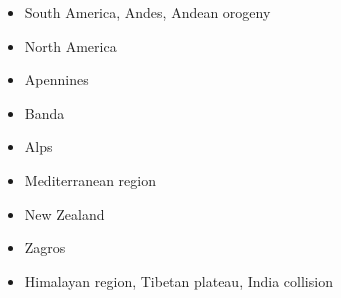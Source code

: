 \begin{itemize}
\item South America, Andes, Andean orogeny 
{\scriptsize
\cite{wdbo94b}
\cite{gusb00}
\cite{vavv02b}
\cite{baso05}\cite{soba05}
\cite{basv06}\cite{meph06}\cite{iabd06}\cite{oncf06}\cite{sobk06}
\cite{iabb07}
\cite{esfm08}\cite{heib08}\cite{iabu08}
\cite{kecw09}\cite{gecm09}
\cite{hucf12}\cite{shlm12}\cite{iadc12}
\cite{waja13}
\cite{cudd15}\cite{ealw15}
\cite{robn16}\cite{marl16}\cite{chdf16}\cite{hulh16}
\cite{sche17}
\cite{yamg19}
}
\item North America 
{\scriptsize
\cite{sabu73}
\cite{huha90}
\cite{bugm97}
\cite{besb06}
\cite{splg08}
\cite{splg09}
\cite{beck12}
\cite{ghbh13}\cite{simi13}
\cite{riag15}
}
\item Apennines 
{\scriptsize
\cite{buwg98}
\cite{shpy07}
\cite{rohu09}
\cite{vami15}
}

\item Banda 
{\scriptsize
\cite{rohu09}
\cite{spha10}
}

\item Alps 
{\scriptsize
\cite{beeh96}
\cite{repe97}
\cite{desw98}
\cite{pfeb00}
\cite{bujl01}
\cite{pfsb02}
\cite{pimo03}
\cite{buge05}
\cite{masp07}
\cite{vifj08}
\cite{luws13}\cite{baes13}
\cite{bubj13}
\cite{bubj14}
\cite{scdu15}\cite{fohk15}
\cite{kids20}
}
\item Mediterranean region 
{\scriptsize
\cite{pimo97}\cite{nesg97}
\cite{nesb99}
\cite{wosp00}
\cite{pimo03}
\cite{spwo04}
\cite{wogs09}
\cite{bofb10}\cite{fabe10}
\cite{chsv14}\cite{chsg14}\cite{vavs14}\cite{mafv14}
\cite{mesj16}
\cite{spcv18}
\cite{blgf20}
}
\item {New Zealand} 
{\scriptsize
\cite{koon90}
\cite{brbe95}
\cite{bekh96}
\cite{wabb98}
\cite{babr99}
\cite{gedh02}\cite{pybf02}
\cite{gehd03}\cite{konc03}\cite{upke03}
\cite{libi06}
\cite{pyeg10}\cite{spgs10a}
\cite{grel12}
\cite{sths13}
}
\item {Zagros} 
{\scriptsize
\cite{vech06}
\cite{hamo10}
\cite{yakm11}
\cite{nipc13}
\cite{frba14}
\cite{ghbu14}
\cite{coyc16}
\cite{rugb17}
}
\item {Himalayan region, Tibetan plateau, India collision} 


\end{itemize}
